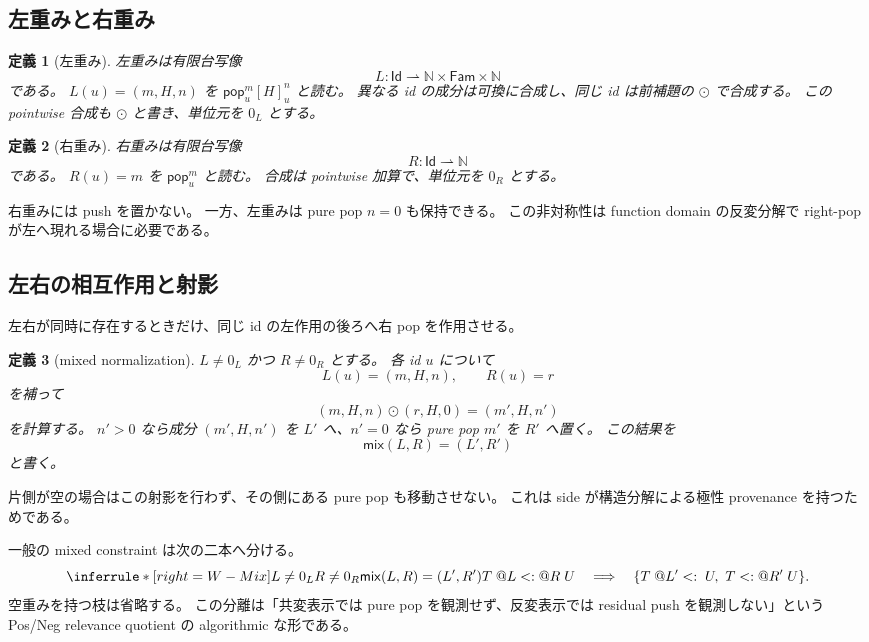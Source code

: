 \documentclass[uplatex,dvipdfmx,a4paper,10.5pt]{jsarticle}
\makeatletter
\theoremstyle{jpplain}
\newtheorem{definition}{定義}[section]
\newcommand{\Fam}{\mathsf{Fam}}
\newcommand{\Id}{\mathsf{Id}}
\newcommand{\Nat}{\mathbb N}
\newcommand{\mix}{\mathsf{mix}}
\newcommand{\takeop}[2]{[#1]_{#2}}
\newcommand{\popop}[1]{\mathsf{pop}_{#1}}
\newcommand{\wsub}[4]{#1\;@#2\mathrel{<:}@#3\;#4}
\newcommand{\lsub}[3]{#1\;@#2\mathrel{<:}\;#3}
\newcommand{\rsub}[3]{#1\mathrel{<:}@#2\;#3}
\makeatother
\begin{document}
\subsection{左重みと右重み}

\begin{definition}[左重み]
左重みは有限台写像
\[
  L:\Id\rightharpoonup \Nat\times\Fam\times\Nat
\]
である。
$L(u)=(m,H,n)$ を $\popop{u}^{m}\takeop{H}{u}^{n}$ と読む。
異なる id の成分は可換に合成し、同じ id は前補題の $\odot$ で合成する。
この pointwise 合成も $\odot$ と書き、単位元を $0_L$ とする。
\end{definition}

\begin{definition}[右重み]
右重みは有限台写像
\[
  R:\Id\rightharpoonup\Nat
\]
である。
$R(u)=m$ を $\popop{u}^{m}$ と読む。
合成は pointwise 加算で、単位元を $0_R$ とする。
\end{definition}

右重みには push を置かない。
一方、左重みは pure pop $n=0$ も保持できる。
この非対称性は function domain の反変分解で right-pop が左へ現れる場合に必要である。

\subsection{左右の相互作用と射影}

左右が同時に存在するときだけ、同じ id の左作用の後ろへ右 pop を作用させる。

\begin{definition}[mixed normalization]
$L\neq0_L$ かつ $R\neq0_R$ とする。
各 id $u$ について
\[
  L(u)=(m,H,n),\qquad R(u)=r
\]
を補って
\[
  (m,H,n)\odot(r,H,0)=(m',H,n')
\]
を計算する。
$n'>0$ なら成分 $(m',H,n')$ を $L'$ へ、$n'=0$ なら pure pop $m'$ を $R'$ へ置く。
この結果を
\[
  \mix(L,R)=(L',R')
\]
と書く。
\end{definition}

片側が空の場合はこの射影を行わず、その側にある pure pop も移動させない。
これは side が構造分解による極性 provenance を持つためである。

\begin{formalbox}
一般の mixed constraint は次の二本へ分ける。
\[
\inferrule*[right=W-Mix]
 {L\neq0_L\\R\neq0_R\\\mix(L,R)=(L',R')}
 {\wsub{T}{L}{R}{U}\quad\Longrightarrow\quad
  \{\lsub{T}{L'}{U},\ \rsub{T}{R'}{U}\}.}
\]
空重みを持つ枝は省略する。
この分離は「共変表示では pure pop を観測せず、反変表示では residual push を観測しない」という
Pos/Neg relevance quotient の algorithmic な形である。
\end{formalbox}
\end{document}
